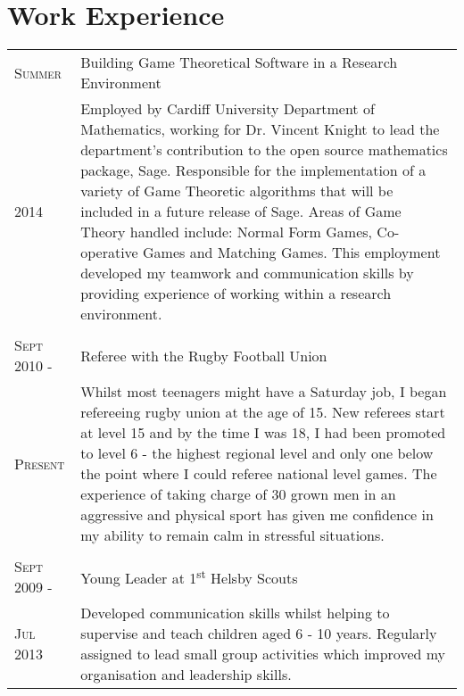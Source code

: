 \documentclass[a4paper, 11pt]{article}
\begin{document}
\section{Work Experience}
\begin{tabularx}{\textwidth}{lX}

\textsc{Summer} & Building Game Theoretical Software in a Research Environment \\
\textsc{2014}& \footnotesize{Employed by Cardiff University Department of Mathematics, working for Dr. Vincent Knight to lead the department's contribution to the open source mathematics package, Sage. Responsible for the implementation of a variety of Game Theoretic algorithms that will be included in a future release of Sage. Areas of Game Theory handled include: Normal Form Games, Co-operative Games and Matching Games. This employment developed my teamwork and communication skills by providing experience of working within a research environment.}\\
\\
\textsc{Sept 2010 -} & Referee with the Rugby Football Union \\
\textsc{Present} & \footnotesize{Whilst most teenagers might have a Saturday job, I began refereeing rugby union at the age of 15. New referees start at level 15 and by the time I was 18, I had been promoted to level 6 - the highest regional level and only one below the point where I could referee national level games. The experience of taking charge of 30 grown men in an aggressive and physical sport has given me confidence in my ability to remain calm in stressful situations.}\\
\\
\textsc{Sept 2009 -} & Young Leader at 1\textsuperscript{st} Helsby Scouts\\
\textsc{Jul 2013}& \footnotesize{Developed communication skills whilst helping to supervise and teach children aged 6 - 10 years. Regularly assigned to lead small group activities which improved my organisation and leadership skills.}\\

\end{tabularx}
\end{document}
